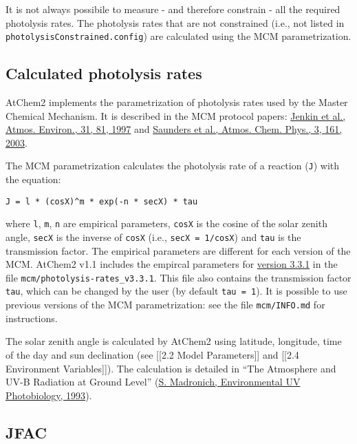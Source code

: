 It is not always possibile to measure - and therefore constrain - all
the required photolysis rates. The photolysis rates that are not
constrained (i.e., not listed in \texttt{photolysisConstrained.config})
are calculated using the MCM parametrization.

\subsection{Calculated photolysis rates} \label{calculated-photolysis-rates}

AtChem2 implements the parametrization of photolysis rates used by the
Master Chemical Mechanism. It is described in the MCM protocol papers:
\href{https://doi.org/10.1016/S1352-2310(96)00105-7}{Jenkin et al.,
Atmos. Environ., 31, 81, 1997} and
\href{https://doi.org/10.5194/acp-3-161-2003}{Saunders et al., Atmos.
Chem. Phys., 3, 161, 2003}.

The MCM parametrization calculates the photolysis rate of a reaction
(\texttt{J}) with the equation:

\begin{verbatim}
J = l * (cosX)^m * exp(-n * secX) * tau
\end{verbatim}

where \texttt{l}, \texttt{m}, \texttt{n} are empirical parameters,
\texttt{cosX} is the cosine of the solar zenith angle, \texttt{secX} is
the inverse of \texttt{cosX} (i.e., \texttt{secX\ =\ 1/cosX}) and
\texttt{tau} is the transmission factor. The empirical parameters are
different for each version of the MCM. AtChem2 v1.1 includes the
empircal parameters for
\href{http://mcm.leeds.ac.uk/MCM/parameters/photolysis_param.htt}{version
3.3.1} in the file \texttt{mcm/photolysis-rates\_v3.3.1}. This file also
contains the transmission factor \texttt{tau}, which can be changed by
the user (by default \texttt{tau\ =\ 1}). It is possible to use previous
versions of the MCM parametrization: see the file \texttt{mcm/INFO.md}
for instructions.

The solar zenith angle is calculated by AtChem2 using latitude,
longitude, time of the day and sun declination (see {[}{[}2.2 Model
Parameters{]}{]} and {[}{[}2.4 Environment Variables{]}{]}). The
calculation is detailed in ``The Atmosphere and UV-B Radiation at Ground
Level'' (\href{https://doi.org//10.1007/978-1-4899-2406-3_1}{S.
Madronich, Environmental UV Photobiology, 1993}).

\subsection{JFAC} \label{jfac}

